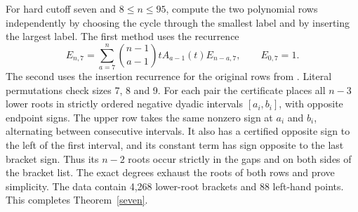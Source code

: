 For hard cutoff seven and \(8\le n\le95\), compute the two polynomial
rows independently by choosing the cycle through the smallest label
and by inserting the largest label. The first method uses the recurrence
\[
 E_{n,7}=\sum_{a=7}^{n}\binom{n-1}{a-1}tA_{a-1}(t)E_{n-a,7},
 \qquad E_{0,7}=1 .
\]
The second uses the insertion recurrence for the original rows from
\cite[Theorem~30]{rr}. Literal permutations check sizes 7, 8 and 9.
For each pair the certificate places all \(n-3\) lower roots in strictly
ordered negative dyadic intervals \([a_i,b_i]\), with opposite endpoint
signs. The upper row takes the same nonzero sign at \(a_i\) and \(b_i\),
alternating between consecutive intervals. It also has a certified
opposite sign to the left of the first interval, and its constant term
has sign opposite to the last bracket sign. Thus its \(n-2\) roots occur
strictly in the gaps and on both sides of the bracket list.
The exact degrees exhaust the roots of both rows and prove simplicity.
The data contain 4,268 lower-root brackets and 88 left-hand points.
This completes Theorem~\ref{seven}.
